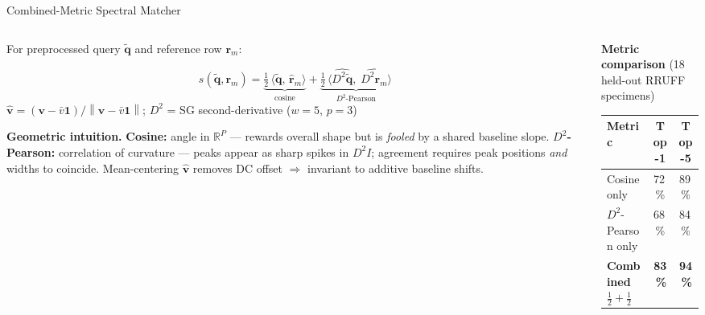 \documentclass[aspectratio=169,10pt]{beamer}
\newcommand{\norm}[1]{\left\|#1\right\|}
\begin{document}
\begin{frame}{Combined-Metric Spectral Matcher}
  \begin{columns}[T]
    \begin{column}{0.54\textwidth}
      For preprocessed query $\tilde{\mathbf{q}}$ and reference row $\mathbf{r}_m$:
      \begin{tcolorbox}[mathbox, top=3pt, bottom=3pt]
        \[
          s(\tilde{\mathbf{q}},\mathbf{r}_m)
          =
          \underbrace{\tfrac{1}{2}\,\langle\tilde{\mathbf{q}},\,\hat{\mathbf{r}}_m\rangle}_{\text{cosine}}
          +
          \underbrace{\tfrac{1}{2}\,
            \bigl\langle\widehat{D^2\tilde{\mathbf{q}}},\;
                        \widehat{D^2\mathbf{r}_m}\bigr\rangle}_{D^2\text{-Pearson}}
        \]
        \centering\scriptsize
        $\hat{\mathbf{v}}=(\mathbf{v}-\bar{v}\mathbf{1})/
         \norm{\mathbf{v}-\bar{v}\mathbf{1}}$;\quad
        $D^2$ = SG second-derivative ($w{=}5$, $p{=}3$)
      \end{tcolorbox}

      \vspace{0.08cm}
      \begin{tcolorbox}[insightbox, top=2pt, bottom=2pt]
        \scriptsize\textbf{Geometric intuition.}
        \textbf{Cosine:} angle in $\mathbb{R}^P$ --- rewards overall shape
        but is \emph{fooled} by a shared baseline slope.
        \textbf{$D^2$-Pearson:} correlation of curvature --- peaks appear
        as sharp spikes in $D^2I$; agreement requires peak positions
        \emph{and} widths to coincide.
        Mean-centering $\hat{\mathbf{v}}$ removes DC offset $\Rightarrow$
        invariant to additive baseline shifts.
      \end{tcolorbox}
    \end{column}
    \begin{column}{0.43\textwidth}
      {\small\bfseries\color{headerbg}Metric comparison}
      (18 held-out RRUFF specimens)

      \vspace{0.06cm}
      \footnotesize
      \begin{tabular}{@{}lcc@{}}
        \toprule
        \textbf{Metric} & \textbf{Top-1} & \textbf{Top-5}\\
        \midrule
        Cosine only       & 72\,\% & 89\,\%\\
        $D^2$-Pearson only & 68\,\% & 84\,\%\\
        \textbf{Combined} $\frac{1}{2}+\frac{1}{2}$
                          & \textbf{83\,\%} & \textbf{94\,\%}\\
        \bottomrule
      \end{tabular}


\end{column}
\end{columns}
\end{frame}
\end{document}
